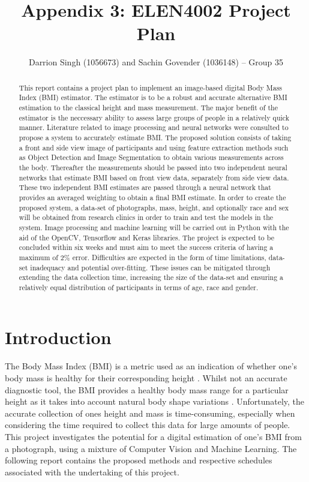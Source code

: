 \documentclass[conference]{IEEEtran}
\title{Appendix 3: ELEN4002 Project Plan}
\author{Darrion Singh (1056673) and Sachin Govender (1036148) -- Group 35}
\begin{document}
\maketitle
\begin{abstract}
This report contains a project plan to implement an image-based digital Body Mass Index (BMI) estimator.
The estimator is to be a robust and accurate alternative BMI estimation to the classical height and mass measurement.
The major benefit of the estimator is the neccessary ability to assess large groups of people in a relatively quick manner.
Literature related to image processing and neural networks were consulted to propose a system to accurately estimate BMI.
The proposed solution consists of taking a front and side view image of participants and using feature extraction methods such as Object Detection and Image Segmentation to obtain various measurements across the body.
Thereafter the measurements should be passed into two independent neural networks that estimate BMI based on front view data, separately from side view data.
These two independent BMI estimates are passed through a neural network that provides an averaged weighting to obtain a final BMI estimate.
In order to create the proposed system, a data-set of photographs, mass, height, and optionally race and sex will be obtained from research clinics in order to train and test the models in the system.
Image processing and machine learning will be carried out in Python with the aid of the OpenCV, Tensorflow and Keras libraries.
The project is expected to be concluded within six weeks and must aim to meet the success criteria of having a maximum of 2\% error.
Difficulties are expected in the form of time limitations, data-set inadequacy and potential over-fitting.
These issues can be mitigated through extending the data collection time, increasing the size of the data-set and ensuring a relatively equal distribution of participants in terms of age, race and gender. 
\end{abstract}
\section{Introduction} \label{intro}
The Body Mass Index (BMI) is a metric used as an indication of whether one's body mass is healthy for their corresponding height \cite{nhsBMI}.
Whilst not an accurate diagnostic tool, the BMI provides a healthy body mass range for a particular height as it takes into account natural body shape variations \cite{nhsBMI}.
Unfortunately, the accurate collection of ones height and mass is time-consuming, especially when considering the time required to collect this data for large amounts of people.
This project investigates the potential for a digital estimation of one's BMI from a photograph, using a mixture of Computer Vision and Machine Learning.
The following report contains the proposed methods and respective schedules associated with the undertaking of this project.
\end{document}
